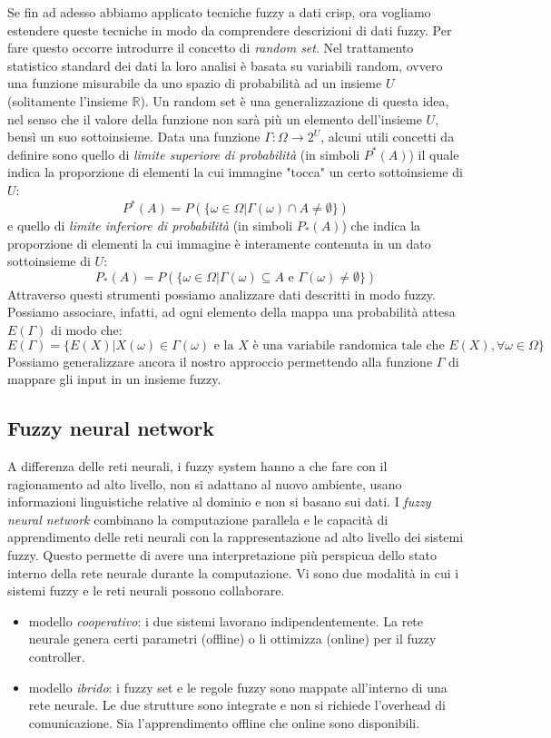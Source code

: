 \documentclass[10pt,a4paper]{article}
\begin{document}
Se fin ad adesso abbiamo applicato tecniche fuzzy a dati crisp, ora vogliamo estendere queste tecniche in modo da comprendere descrizioni di dati fuzzy. Per fare questo occorre introdurre il concetto di \emph{random set}. Nel trattamento statistico standard dei dati la loro analisi è basata su variabili random, ovvero una funzione misurabile da uno spazio di probabilità ad un insieme $U$ (solitamente l'insieme $\mathbb{R}$). Un random set è una generalizzazione di questa idea, nel senso che il valore della funzione non sarà più un elemento dell'insieme $U$, bensì un suo sottoinsieme. Data una funzione $\Gamma: \Omega \to 2^U$, alcuni utili concetti da definire sono quello di \emph{limite superiore di probabilità} (in simboli $P^*(A)$) il quale indica la proporzione di elementi la cui immagine "tocca" un certo sottoinsieme di $U$:
$$
P^*(A) = P(\{ \omega \in \Omega | \Gamma (\omega) \cap A \neq \emptyset \})
$$
e quello di \emph{limite inferiore di probabilità} (in simboli $P_*(A)$) che indica la proporzione di elementi la cui immagine è interamente contenuta in un dato sottoinsieme di $U$:
$$
P_*(A) = P(\{ \omega \in \Omega | \Gamma (\omega) \subseteq A \text{ e } \Gamma(\omega) \neq \emptyset \})
$$
Attraverso questi strumenti possiamo analizzare dati descritti in modo fuzzy. Possiamo associare, infatti, ad ogni elemento della mappa una probabilità attesa $E(\Gamma)$ di modo che:
$$
E(\Gamma) = \{ E(X) | X(\omega) \in \Gamma(\omega) \text{ e la } X \text{ è una variabile randomica tale che } E(X), \forall \omega \in \Omega \}
$$
Possiamo generalizzare ancora il nostro approccio permettendo alla funzione $\Gamma$ di mappare gli input in un insieme fuzzy.

\subsection{Fuzzy neural network}

A differenza delle reti neurali, i fuzzy system hanno a che fare con il ragionamento ad alto livello, non si adattano al nuovo ambiente, usano informazioni linguistiche relative al dominio e non si basano sui dati. I \emph{fuzzy neural network} combinano la computazione parallela e le capacità di apprendimento delle reti neurali con la rappresentazione ad alto livello dei sistemi fuzzy. Questo permette di avere una interpretazione più perspicua dello stato interno della rete neurale durante la computazione. Vi sono due modalità in cui i sistemi fuzzy e le reti neurali possono collaborare.

\begin{itemize}
\item{modello \emph{cooperativo}: i due sistemi lavorano indipendentemente. La rete neurale genera certi parametri (offline) o li ottimizza (online) per il fuzzy controller.}
\item{modello \emph{ibrido}: i fuzzy set e le regole fuzzy sono mappate all'interno di una rete neurale. Le due strutture sono integrate e non si richiede l'overhead di comunicazione. Sia l'apprendimento offline che online sono disponibili.}
\end{itemize}
\end{document}

